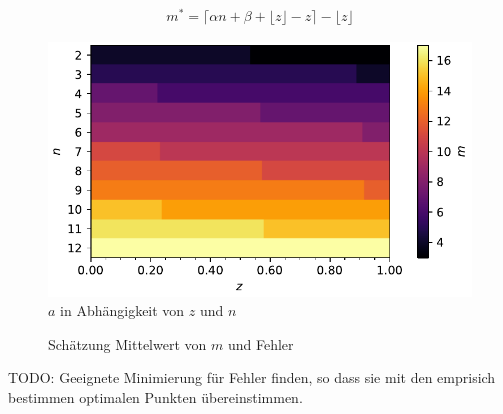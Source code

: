 \begin{align*}
m^*
=
\lceil \alpha n + \beta + \lfloor z \rfloor - z \rceil - \lfloor z \rfloor
\end{align*}

\begin{figure}
\centering
\includegraphics{papers/laguerre/images/targets.pdf}
\caption{$a$ in Abhängigkeit von $z$ und $n$}
\label{laguerre:fig:targets}
\end{figure}


\begin{figure}
\centering

\caption{Schätzung Mittelwert von $m$ und Fehler}
\label{laguerre:fig:schaetzung}
\end{figure}



{
\large \color{red}
TODO:
Geeignete Minimierung für Fehler finden, so dass sie mit den emprisich
bestimmen optimalen Punkten übereinstimmen.
}
